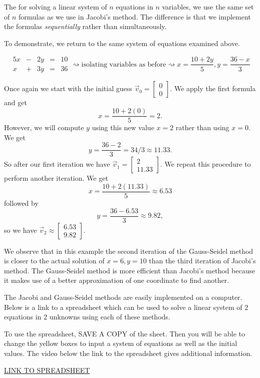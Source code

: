 \documentclass{ximera}
\begin{document}
The  for solving a linear system of $n$ equations in $n$ variables, we use the same set of $n$ formulas as we use in Jacobi's method.  The difference is that we implement the formulas \emph{sequentially} rather than simultaneously.

To demonstrate, we return to the same system of equations examined above.

\begin{equation*}\begin{array}{ccccc}
      5x& -&2y&=&10\\
      x & +&3y&= &36 
    \end{array}
\rightsquigarrow\text{isolating variables as before}\rightsquigarrow
      x=\dfrac{10+2y}{5},
      y=\dfrac{36-x}{3}
\end{equation*}

Once again we start with the initial guess $\vec{v}_0 = \begin{bmatrix} 0\\0 \end{bmatrix}$.  We apply the first formula and get
$$x= \dfrac{10+2(0)}{5}=2.$$
However, we will compute $y$ using this new value $x=2$ rather than using $x=0$.  We get
$$y=\dfrac{36-2}{3} 
= 34/3 \approx 11.33.$$  So after our first iteration we have $\vec{v}_1 = \begin{bmatrix} 2\\11.33 \end{bmatrix}$.
We repeat this procedure to perform another iteration.  We get 
$$x= \dfrac{10+2(11.33)}{5}\approx 6.53$$
followed by
$$y=\dfrac{36-6.53}{3} \approx 9.82,$$
so we have $\vec{v}_2 \approx \begin{bmatrix} 6.53\\9.82 \end{bmatrix}$.

We observe that in this example the second iteration of the Gauss-Seidel method is closer to the actual solution of $x=6, y=10$ than the third iteration of Jacobi's method.  The Gauss-Seidel method is more efficient than Jacobi's method because it makes use of a better approximation of one coordinate to find another.

\begin{exploration}\label{exp:jacobi&gauss-seidel2x2spreadsheet}
The Jacobi and Gauss-Seidel methods are easily implemented on a computer.  Below is a link to a spreadsheet which can be used to solve a linear system of 2 equations in 2 unknowns using each of these methods.

To use the spreadsheet, SAVE A COPY of the sheet.  Then you will be able to change the yellow boxes to input a system of equations as well as the initial values.  The video below the link to the spreadsheet gives additional information.
    
\href{https://docs.google.com/spreadsheets/d/1CyQ9jvOL9WMxcphNu4QlM8ZQAkU2oHDQEbK2ORw7k-o/edit?usp=sharing}{LINK TO SPREADSHEET}

\end{exploration}
\end{document}
